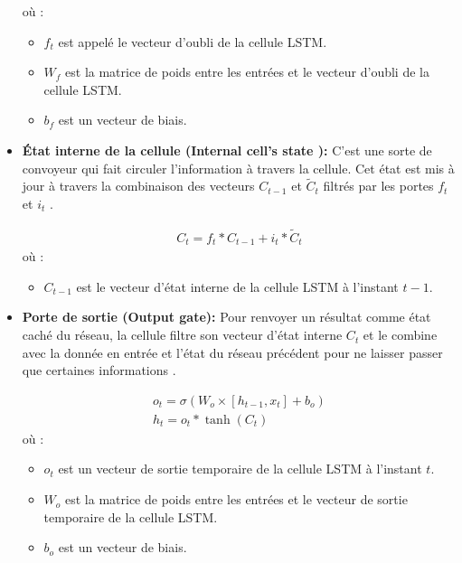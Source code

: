 \begin{itemize}
		où : 
	\begin{itemize}
		\item $f_t$ est appelé le vecteur d'oubli de la cellule LSTM.
		\item $W_f$ est la matrice de poids entre les entrées et le vecteur d'oubli de la cellule LSTM.
		\item $b_f$ est un vecteur de biais.		
	\end{itemize}
	\item \textbf{État interne de la cellule (Internal cell's state ): } C'est une sorte de convoyeur qui fait circuler l'information à travers la cellule. Cet état est mis à jour à travers la combinaison des vecteurs $C_{t - 1}$ et $\tilde{C}_t$ filtrés par les portes $f_t$ et $i_t$ \citep{lstm_original_paper}.
	
	\begin{equation}
	\begin{gathered}
	C_t = f_t * C_{t-1} + i_t*\tilde{C}_t
	\end{gathered}
	\end{equation}
	où :
	\begin{itemize}
		\item $C_{t-1}$ est le vecteur d'état interne de la cellule LSTM à l'instant $t-1$.
	\end{itemize}
	\item \textbf{Porte de sortie (Output gate): } Pour renvoyer un résultat comme état caché du réseau, la cellule filtre son vecteur d'état interne $C_t$ et le combine avec la donnée en entrée et l'état du réseau précédent pour ne laisser passer que certaines informations \citep{rnns_online,lstm_original_paper,rnn_lstms}.
	
	\begin{equation}
	\begin{gathered}
	o_t =  \sigma(W_o \times [h_{t-1},x_t] + b_o) \\
	h_t = o_t * \tanh(C_t)
	\end{gathered}
	\end{equation}
	où :
	\begin{itemize}
		\item $o_{t}$ est un vecteur de sortie temporaire de la cellule LSTM à l'instant $t$.
		\item $W_o$ est la matrice de poids entre les entrées et le vecteur de sortie temporaire de la cellule LSTM.
		\item $b_o$ est un vecteur de biais.
			
	\end{itemize}
\end{itemize}

